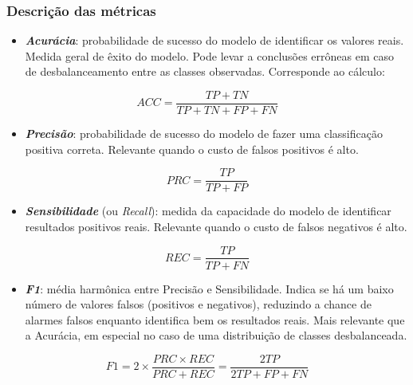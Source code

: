 \documentclass[]{article}
\begin{document}
\hypertarget{header-n1120}{%
\subsubsection{Descrição das métricas}\label{header-n1120}}

\begin{itemize}
\item
  \textbf{\emph{Acurácia}}: probabilidade de sucesso do modelo de
  identificar os valores reais. Medida geral de êxito do modelo. Pode
  levar a conclusões errôneas em caso de desbalanceamento entre as
  classes observadas. Corresponde ao cálculo:
\end{itemize}

\[ACC = \frac{TP + TN}{TP + TN + FP + FN}\]

\begin{itemize}
\item
  \textbf{\emph{Precisão}}: probabilidade de sucesso do modelo de fazer
  uma classificação positiva correta. Relevante quando o custo de falsos
  positivos é alto.
\end{itemize}

\[PRC = \frac{TP}{TP + FP}\]

\begin{itemize}
\item
  \textbf{\emph{Sensibilidade}} (ou \emph{Recall}): medida da capacidade
  do modelo de identificar resultados positivos reais. Relevante quando
  o custo de falsos negativos é alto.
\end{itemize}

\[REC = \frac{TP}{TP + FN}\]

\begin{itemize}
\item
  \textbf{\emph{F1}}: média harmônica entre Precisão e Sensibilidade.
  Indica se há um baixo número de valores falsos (positivos e
  negativos), reduzindo a chance de alarmes falsos enquanto identifica
  bem os resultados reais. Mais relevante que a Acurácia, em especial no
  caso de uma distribuição de classes desbalanceada.
\end{itemize}

\[F1 =  2\times\frac{PRC \times REC}{PRC + REC}   = \frac{2TP}{2TP + FP + FN}\]
\end{document}
